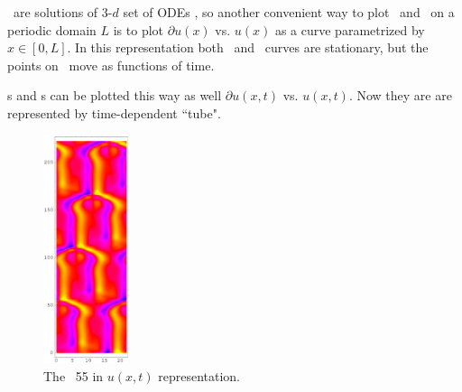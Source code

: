 \Eqv\ are solutions of 3-$d$ set of ODEs  , so
another convenient way to plot \eqva\ and \reqva\ on a periodic
domain $L$ is to plot 
$\partial u(x)$ vs. $u(x)$ as a curve parametrized by
$x\in [0,L]$. In this representation both \eqva\ and \reqva\ curves are
stationary, but the points on \reqva\ move as functions of time.

\Po s and \rpo s can be plotted this way as well
$\partial u(x,t)$ vs. $u(x,t)$. Now they are are represented by time-dependent
``tube".



\begin{figure}[t] %
\centering
 	\includegraphics[width=2.5cm]{figs/rpo22-55-4-u.eps}
\hspace{0.1in}
\caption{
 The \rpo\ {\nameit}55 in $u(x,t)$ representation. 
        }
\label{f:rpo55u}
\end{figure}



